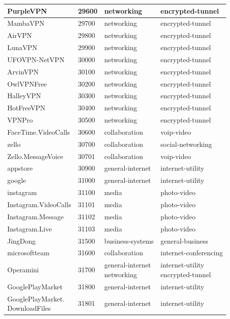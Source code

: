 \begin{longtable}{p{}|p{}|p{}|p{}}
    PurpleVPN &	29600 &	networking &	encrypted-tunnel \\ \hline
    MambaVPN &	29700 &	networking &	encrypted-tunnel \\ \hline
    AirVPN &	29800 &	networking &	encrypted-tunnel \\ \hline
    LunaVPN &	29900 &	networking &	encrypted-tunnel \\ \hline
    UFOVPN-NetVPN &	30000 &	networking &	encrypted-tunnel \\ \hline
    ArvinVPN &	30100 &	networking &	encrypted-tunnel \\ \hline
    OwlVPNFree &	30200 &	networking &	encrypted-tunnel \\ \hline
    HalleyVPN &	30300 &	networking &	encrypted-tunnel \\ \hline
    HotFreeVPN &	30400 &	networking &	encrypted-tunnel \\ \hline
    VPNPro &	30500 &	networking &	encrypted-tunnel \\ \hline
    FaceTime.VideoCalls &	30600 &	collaboration &	voip-video \\ \hline
    zello &	30700 &	collaboration &	social-networking \\ \hline
    Zello.MessageVoice &	30701 &	collaboration &	voip-video \\ \hline
    appstore &	30900 &	general-internet &	internet-utility \\ \hline
    google &	31000 &	general-internet &	internet-utility \\ \hline
    instagram &	31100 &	media &	photo-video \\ \hline
    Instagram.VideoCalls &	31101 &	media &	photo-video \\ \hline
    Instagram.Message &	31102 &	media &	photo-video \\ \hline
    Instagram.Live &	31103 &	media &	photo-video \\ \hline
    JingDong &	31500 &	business-systems &	general-business \\ \hline
    microsoftteam &	31600 &	collaboration &	internet-conferencing \\ \hline
    Operamini &	31700 &	\tabincell{l}{general-internet\\ networking} &	\tabincell{l}{internet-utility\\ encrypted-tunnel} \\ \hline
    GooglePlayMarket &	31800 &	general-internet &	internet-utility \\ \hline
    \tabincell{l}{GooglePlayMarket.\\DownloadFiles} &	31801 &	general-internet &	internet-utility \\ \hline

\end{longtable}
